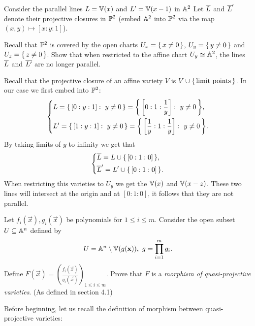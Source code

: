 \documentclass[12pt]{memoir}
\begin{document}
\begin{Ej}
  Consider the parallel lines $L = \mathbb{V}(x)$ and $L' = \mathbb{V}(x-1)$ in $\mathbb{A}^2$ Let $\overline L$ and $\overline L'$ denote their projective closures in $\mathbb{P}^2$ (embed $\mathbb{A}^2$ into $\mathbb{P}^2$ via the map $(x, y)\mapsto [x : y : 1]$).\par 
  Recall that $\mathbb{P}^2$ is covered by the open charts $U_x=\{\,x\neq 0\,\}$, $U_y=\{\,y\neq 0\,\}$ and $U_z=\{\,z\neq 0\,\}$. Show that when restricted to the affine chart $U_y\simeq\mathbb{A}^2$, the lines $\overline L$
  and $\overline{L'}$ are no longer parallel.
\end{Ej}

  \begin{ptcbr}
    Recall that the projective closure of an affine variety $V$ is $V\cup\{\,\text{limit points}\,\}$. In our case we first embed into $\mathbb{P}^2$: 
    $$\left\lbrace
    \begin{aligned}
      &L=\{\,[0:y:1]:\ y\neq 0\,\}=\biggl\{\,\left\lbrack0:1:\frac{1}{y}\right\rbrack:\ y\neq 0\,\biggr\},\\
      &L'=\{\,[1:y:1]:\ y\neq 0\,\}=\biggl\{\,\left\lbrack\frac{1}{y}:1:\frac{1}{y}\right\rbrack:\ y\neq 0\,\biggr\}.\\
    \end{aligned}
    \right.$$
    By taking limits of $y$ to infinity we get that 
    $$\left\lbrace
    \begin{aligned}
      &\overline L=L\cup\{\,[0:1:0]\,\},\\
      &\overline L'=L'\cup\{\,[0:1:0]\,\}.\\
    \end{aligned}
    \right.$$
    When restricting this varieties to $U_y$ we get the $\mathbb{V}(x)$ and $\mathbb{V}(x-z)$. These two lines will intersect at the origin and at $[0:1:0]$, it follows that they are not parallel.
  \end{ptcbr}

  \begin{Ej}
    Let $f_i(\vec{x}),g_i(\vec{x})$ be polynomials for $1\leq i\leq m$. Consider the open subset $U\subseteq\mathbb{A}^n$ defined by 
    $$U=\mathbb{A}^n\setminus\mathbb{V}(g(\mathbf{x})),\ g=\prod_{i=1}^m g_i.$$
    Define $F(\vec{x})=\left(\frac{f_i(\vec{x})}{g_{i}(\vec{x})}\right)_{1\leq i\leq m}$. Prove that $F$ is a \emph{morphism of quasi-projective varieties}. (As defined in section 4.1)
  \end{Ej}

  Before beginning, let us recall the definition of morphism between quasi-projective varieties:
\end{document}

